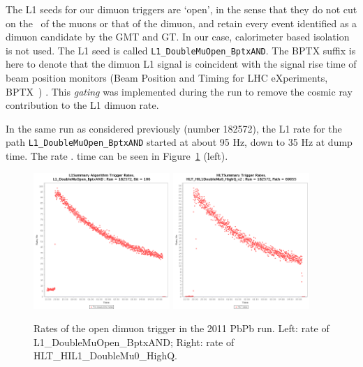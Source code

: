 The L1 seeds for our dimuon triggers are `open', in the sense that
they do not cut on the \pt\ of the muons or that of the dimuon, and retain every event
identified as a dimuon candidate by the GMT and GT. In our case,
calorimeter based isolation is not used. The L1 seed is called
\verb?L1_DoubleMuOpen_BptxAND?. The BPTX suffix is here to denote that
the dimuon L1 signal is coincident with the signal rise time of beam
position monitors (Beam Position and Timing for LHC eXperiments, BPTX~\cite{4774822}) . This \textit{gating} was implemented
during the run to remove the cosmic ray contribution to the L1 dimuon rate.

In the same run as considered previously (number 182572), the L1 rate
for the path \verb?L1_DoubleMuOpen_BptxAND? started at about 95 Hz,
down to 35 Hz at dump time. The rate \vs. time can be seen in
Figure~\ref{fig:rate2011} (left).

\begin{figure}[h]
\begin{center}
\includegraphics[width=0.46\textwidth]{Chapters/xLHCMS/L1rate_2011.png}
\includegraphics[width=0.46\textwidth]{Chapters/xLHCMS/HLTrate_2011.png}
\caption{Rates of the open dimuon trigger in the 2011 PbPb run. Left:
  rate of L1\_DoubleMuOpen\_BptxAND; Right: rate of HLT\_HIL1\_DoubleMu0\_HighQ.} 
\label{fig:rate2011}
\end{center}
\end{figure}


